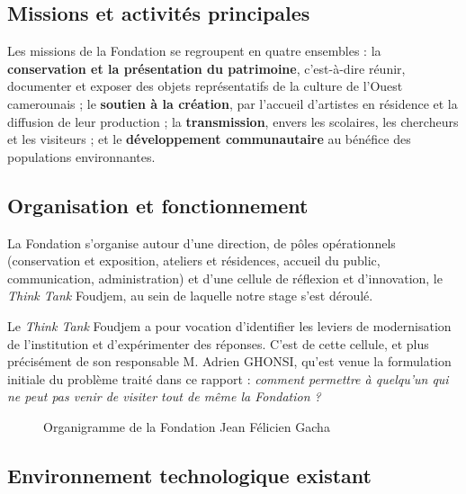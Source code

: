 \subsection{Missions et activités principales}

Les missions de la Fondation se regroupent en quatre ensembles : la
\textbf{conservation et la présentation du patrimoine}, c'est-à-dire réunir,
documenter et exposer des objets représentatifs de la culture de l'Ouest
camerounais ; le \textbf{soutien à la création}, par l'accueil d'artistes en
résidence et la diffusion de leur production ; la \textbf{transmission}, envers
les scolaires, les chercheurs et les visiteurs ; et le \textbf{développement
communautaire} au bénéfice des populations environnantes.

\subsection{Organisation et fonctionnement}

La Fondation s'organise autour d'une direction, de pôles opérationnels
(conservation et exposition, ateliers et résidences, accueil du public,
communication, administration) et d'une cellule de réflexion et d'innovation,
le \emph{Think Tank} Foudjem, au sein de laquelle notre stage s'est déroulé.

Le \emph{Think Tank} Foudjem a pour vocation d'identifier les leviers de
modernisation de l'institution et d'expérimenter des réponses. C'est de cette
cellule, et plus précisément de son responsable M. Adrien GHONSI, qu'est venue
la formulation initiale du problème traité dans ce rapport : \emph{comment
permettre à quelqu'un qui ne peut pas venir de visiter tout de même la
Fondation ?}

\begin{figure}[htbp]
\centering
{}
\caption{Organigramme de la Fondation Jean Félicien Gacha}
\label{fig:organigramme}
\end{figure}

\subsection{Environnement technologique existant}

